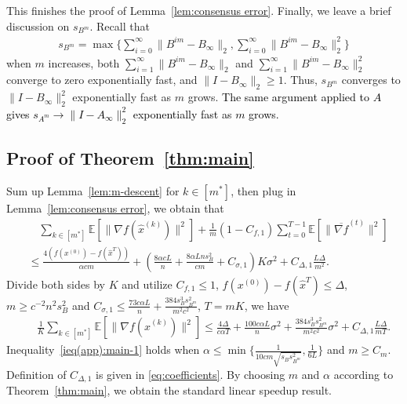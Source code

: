 \documentclass[10pt]{article}
\newcommand{\EE}{\mathbb{E}}
\newcommand{\norm}[1]{\| #1 \|}
\newcommand{\revision}[1]{\textcolor{black}{#1}}
\begin{document}
This finishes the proof of Lemma~\ref{lem:consensus error}. Finally, we leave a brief discussion on $s_{B^m}$. Recall that
\begin{align}\label{eq:s_B^m_def_in_appendix}
s_{B^m}= \max\{\sum_{i=0}^\infty \norm{B^{im}-B_\infty}_2, \sum_{i=0}^\infty \norm{B^{im}-B_\infty}_2^2\}
\end{align}
when $m$ increases, both $\sum_{i=1}^\infty \norm{B^{im}-B_\infty}_2$ and $\sum_{i=1}^\infty \norm{B^{im}-B_\infty}_2^2$ converge to zero exponentially fast, and $\norm{I-B_\infty}_2\ge 1$. Thus, $s_{B^m}$ converges to $\norm{I-B_\infty}_2^2$ exponentially fast as $m$ grows. \revision{The same argument applied to $A$ gives $s_{A^m}\to\norm{I-A_\infty}_2^2$ exponentially fast as $m$ grows.}

\subsection{Proof of Theorem~\ref{thm:main}}\label{app:subsec:main}
Sum up Lemma~\ref{lem:m-descent} for $k\in[m^*]$, then plug in Lemma~\ref{lem:consensus error}, we obtain that
\begin{align}\label{eq:dx-3}
    &\quad\sum_{k\in[m^*]}\EE[\norm{\nabla f(\hat{x}^{(k)})}^2]+\frac{1}{m}(1-C_{f,1})\sum_{t=0}^{T-1}\EE[\norm{\overline{\nabla f}^{(t)}}^2]\\
    &\le \frac{4(f(x^{(0)})-f(\hat{x}^{T}))}{\alpha cm}+\left(\frac{8\alpha c L}{n}+\frac{8\alpha Lns_B^2}{cm}+ C_{\sigma,1}\right)K\sigma^2+C_{\Delta,1}\frac{ L\Delta}{m^2}\nonumber.
\end{align}
Divide both sides by $K$ and utilize $C_{f,1}\le 1$, $f(x^{(0)})-f(\hat{x}^{T})\le \Delta$, $m\ge c^{-2}n^{2}s_B^2$ and $C_{\sigma,1}\le \frac{73 c\alpha L}{n}+\frac{384s_B^3s_{B^m}^2}{m^2c^2}$, $T=mK$, we have
\begin{align}\label{ieq(app):main-1}
    &\quad\frac{1}{K}\sum_{k\in [m^*]}\EE[\norm{\nabla f(\hat{x}^{(k)})}^2]\le \frac{4\Delta}{c\alpha T}  + \frac{100 c\alpha L}{n}\sigma^2+ \frac{384s_B^3s_{B^m}^2}{m^2c^2}\sigma^2 + C_{\Delta,1}\frac{L\Delta}{mT}.
\end{align}
Inequality~\eqref{ieq(app):main-1} holds when $\alpha \le \min\{\frac{1}{10cm\sqrt{s_Bs_{B^m}^2}},\frac{1}{6L}\}$ and $m\ge C_m$. 
Definition of $C_{\Delta,1}$ is given in \eqref{eq:coefficients}.
By choosing $m$ and $\alpha$ according to Theorem~\ref{thm:main}, we obtain the standard linear speedup result. 


\end{document}
